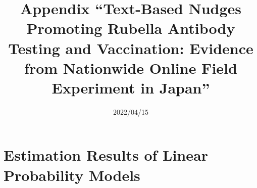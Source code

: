 \documentclass[
  11pt,
  a4paper,
]{article}
\title{Appendix
``Text-Based Nudges Promoting Rubella Antibody Testing and Vaccination:
Evidence from Nationwide Online Field Experiment in Japan''  }
\date{2022/04/15}
\begin{document}
\begin{spacing}{1}
  \maketitle
\end{spacing}

\hypertarget{appendix-appendix}{%
\appendix}


\hypertarget{estimation-results-of-linear-probability-models}{%
\section{Estimation Results of Linear Probability Models}\label{estimation-results-of-linear-probability-models}}

\begin{table}


\end{table}
\end{document}
